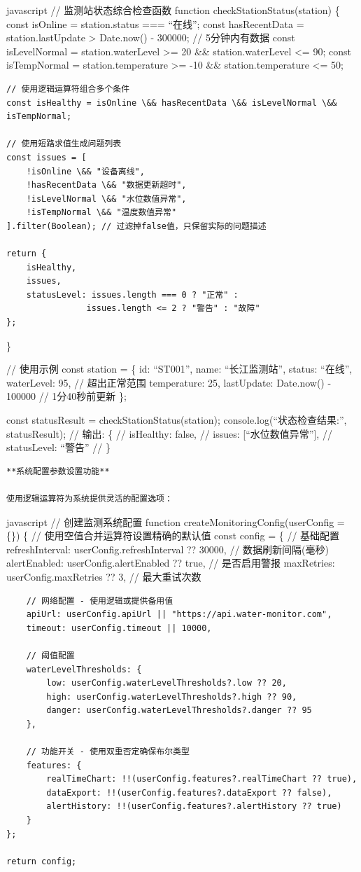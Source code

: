 javascript // 监测站状态综合检查函数 function checkStationStatus(station) \{ const isOnline = station.status === ``在线''; const hasRecentData = station.lastUpdate \textgreater{} Date.now() - 300000; // 5分钟内有数据 const isLevelNormal = station.waterLevel \textgreater= 20 \&\& station.waterLevel \textless= 90; const isTempNormal = station.temperature \textgreater= -10 \&\& station.temperature \textless= 50;

\begin{verbatim}
// 使用逻辑运算符组合多个条件
const isHealthy = isOnline \&& hasRecentData \&& isLevelNormal \&& isTempNormal;

// 使用短路求值生成问题列表
const issues = [
    !isOnline \&& "设备离线",
    !hasRecentData \&& "数据更新超时", 
    !isLevelNormal \&& "水位数值异常",
    !isTempNormal \&& "温度数值异常"
].filter(Boolean); // 过滤掉false值，只保留实际的问题描述

return {
    isHealthy,
    issues,
    statusLevel: issues.length === 0 ? "正常" : 
                issues.length <= 2 ? "警告" : "故障"
};
\end{verbatim}

\}

// 使用示例 const station = \{ id: ``ST001'', name: ``长江监测站'', status: ``在线'', waterLevel: 95, // 超出正常范围 temperature: 25, lastUpdate: Date.now() - 100000 // 1分40秒前更新 \};

const statusResult = checkStationStatus(station); console.log(``状态检查结果:'', statusResult); // 输出: \{ // isHealthy: false, // issues: {[}``水位数值异常''{]}, // statusLevel: ``警告'' // \}

\begin{lstlisting}
**系统配置参数设置功能**

使用逻辑运算符为系统提供灵活的配置选项：
\end{lstlisting}

javascript // 创建监测系统配置 function createMonitoringConfig(userConfig = \{\}) \{ // 使用空值合并运算符设置精确的默认值 const config = \{ // 基础配置 refreshInterval: userConfig.refreshInterval ?? 30000, // 数据刷新间隔(毫秒) alertEnabled: userConfig.alertEnabled ?? true, // 是否启用警报 maxRetries: userConfig.maxRetries ?? 3, // 最大重试次数

\begin{verbatim}
    // 网络配置 - 使用逻辑或提供备用值
    apiUrl: userConfig.apiUrl || "https://api.water-monitor.com",
    timeout: userConfig.timeout || 10000,
    
    // 阈值配置
    waterLevelThresholds: {
        low: userConfig.waterLevelThresholds?.low ?? 20,
        high: userConfig.waterLevelThresholds?.high ?? 90,
        danger: userConfig.waterLevelThresholds?.danger ?? 95
    },
    
    // 功能开关 - 使用双重否定确保布尔类型
    features: {
        realTimeChart: !!(userConfig.features?.realTimeChart ?? true),
        dataExport: !!(userConfig.features?.dataExport ?? false),
        alertHistory: !!(userConfig.features?.alertHistory ?? true)
    }
};

return config;
\end{verbatim}

